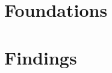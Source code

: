 \documentclass[
  fontsize=10pt,
  paper=a4,
  twoside,
  openright,
  cleardoublepage=empty,
  numbers=noenddot,
  bibliography=totoc,
  listof=notoc,
  captions=tableheading,
  parskip=false,
]{scrbook}
\begin{document}
\frontmatter



\tableofcontents
\listoffigures
\listoftables


\mainmatter
\part{Foundations}



\part{Findings}



\appendix


\backmatter
\printbibliography[title={References}]
\end{document}
